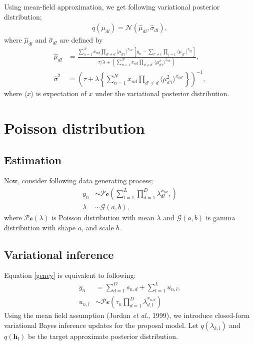 \documentclass[12pt]{amsart}
\begin{document}
Using mean-field approximation, we get following variational posterior distribution; 
\begin{align*}
q(\mu_{dl})= \mathcal{N}(\hat \mu_{dl},\hat \sigma_{dl}), 
\end{align*}
where $\hat \mu_{dl}$ and $\hat \sigma_{dl}$ are defined by
\begin{align*}
\hat \mu_{dl} &=\frac{\sum_{n=1}^N x_{nd}\prod_{d' \neq d} \langle \mu_{d'l} \rangle ^{x_{nd'}} \left[y_n -\sum_{l'\neq l}\prod_{j=1}  \langle \mu_{jl'} \rangle ^{x_{nj}}  \right]}{\tau/\lambda + \left( \sum_{n=1}^N x_{nd}\prod_{d\neq d'} \langle \mu_{d'l}^{2} \rangle ^{x_{nd'}} \right)},\\
\hat \sigma^2 &=\left(\tau + \lambda \left\{\sum_{n=1}^N x_{nd}\prod_{d' \neq d}  \langle \mu_{d'l}^2 \rangle ^{x_{nd'}}\right\} \right)^{-1},
\end{align*}
where $\langle x \rangle$ is expectation of $x$ under the variational posterior distribution.

\section{Poisson distribution}
\subsection{Estimation}

Now, consider following data generating process; 
\begin{align}
y_n &\sim \mathcal{Po}\left(\sum_{l=1}^L \prod_{d=1}^D \lambda_{dl}^{x_{nd}}, \right) \label{geney}\\
\lambda &\sim \mathcal{G}(a, b), \nonumber
\end{align}
where $\mathcal{Po}(\lambda)$ is Poisson distribution with mean $\lambda$ and $\mathcal{G}(a, b)$ is gamma distribution with shape $a$, and scale $b$. 

\subsection{Variational inference}
Equation \ref{geney} is equivalent to following:
\begin{align}
y_{n} &= \sum_{d=1}^{D} s_{n,d}+\sum_{l=1}^{L}u_{n,l},\nonumber \\
u_{n,l} &\sim \mathcal{Po}\left(\tau_n \prod_{d=1}^{D}\lambda_{d,l}^{x_{n,d}} \right)
\end{align}
Using the mean field assumption (Jordan \textit{et al}., 1999), we introduce closed-form variational Bayes inference updates for the proposal model.
Let $q(\lambda_{k,l})$ and $q(\boldsymbol{h}_{l})$ be the target approximate posterior distribution.
\end{document}

